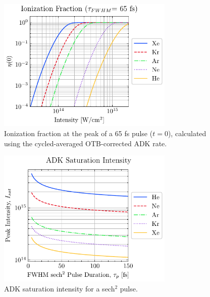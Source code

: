 \begin{figure}
	\centering
	\includegraphics[width=0.75\textwidth]{figures/chap1/ADK_ion_frac_TL.pdf}
	\caption{Ionization fraction at the peak of a 65 fs pulse ($t=0$), calculated using the cycled-averaged OTB-corrected ADK rate.}
	\label{fig:ADK_ion_frac}
\end{figure}

\begin{figure}
	\centering
	\includegraphics[width=0.75\textwidth]{figures/chap1/saturation_intensity.pdf}
	\caption{ADK saturation intensity for a sech$^2$ pulse.}
	\label{fig:saturation_intensity}
\end{figure}

